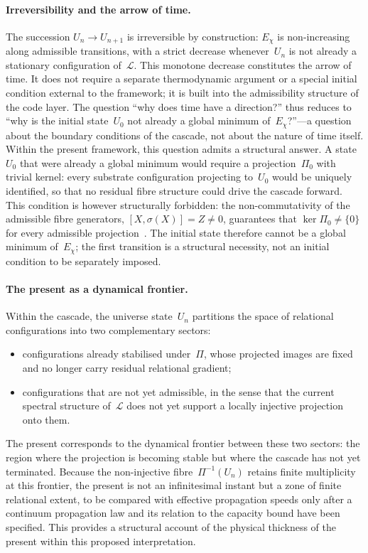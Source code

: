   \paragraph{Irreversibility and the arrow of time.}
    The succession $U_n \to U_{n+1}$ is irreversible by construction:
    $E_\chi$ is non-increasing along admissible transitions, with a strict decrease
    whenever~$U_n$ is not already a stationary configuration of~$\mathcal{L}$.
    This monotone decrease constitutes the arrow of time.
    It does not require a separate thermodynamic argument or a special initial
    condition external to the framework; it is built into the admissibility structure of the code layer.
    The question ``why does time have a direction?'' thus reduces to
    ``why is the initial state~$U_0$ not already a global minimum of~$E_\chi$?''---a
    question about the boundary conditions of the cascade, not about the nature of time itself.
    Within the present framework, this question admits a structural answer.
    A state~$U_0$ that were already a global minimum would require a
    projection~$\Pi_0$ with trivial kernel: every substrate configuration
    projecting to~$U_0$ would be uniquely identified, so that no residual
    fibre structure could drive the cascade forward.
    This condition is however structurally forbidden: the non-commutativity of
    the admissible fibre generators, $[X,\sigma(X)] = Z \neq 0$, guarantees
    that $\ker\Pi_0 \neq \{0\}$ for every admissible projection~\cite{Beau2026m}.
    The initial state therefore cannot be a global minimum of~$E_\chi$; the
    first transition is a structural necessity, not an initial condition to be
    separately imposed.

  \paragraph{The present as a dynamical frontier.}
    Within the cascade, the universe state~$U_n$ partitions the space of relational
    configurations into two complementary sectors:
    \begin{itemize}
      \item configurations already stabilised under~$\Pi$, whose projected images
      are fixed and no longer carry residual relational gradient;
      \item configurations that are not yet admissible, in the sense that the
      current spectral structure of~$\mathcal{L}$ does not yet support a locally injective projection onto them.
    \end{itemize}
    The present corresponds to the dynamical frontier between these two sectors:
    the region where the projection is becoming stable but where the cascade has not yet terminated.
    Because the non-injective fibre~$\Pi^{-1}(U_n)$ retains finite multiplicity at
    this frontier, the present is not an infinitesimal instant but a zone of finite
    relational extent, to be compared with effective propagation speeds only after a continuum
    propagation law and its relation to the capacity bound have been specified.
    This provides a structural account of the physical thickness of the present
    within this proposed interpretation.

